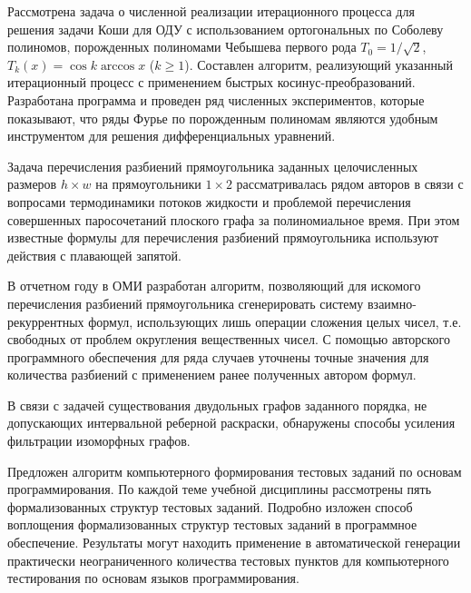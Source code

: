 Рассмотрена задача о численной реализации итерационного процесса для решения задачи Коши для ОДУ с использованием ортогональных по Соболеву полиномов, порожденных полиномами Чебышева первого рода $T_0=1/\sqrt{2}$, $T_k(x)=\cos k\arccos x$ ($k\ge1$). Составлен алгоритм, реализующий указанный итерационный процесс с применением быстрых косинус-преобразова\-ний. Разработана программа и проведен ряд численных экспериментов, которые показывают, что ряды Фурье по порожденным полиномам являются удобным инструментом для решения дифференциальных уравнений.









Задача перечисления разбиений прямоугольника заданных целочисленных размеров $h\times w$ на прямоугольники $1\times 2$ рассматривалась рядом авторов в связи с вопросами термодинамики потоков жидкости и проблемой перечисления совершенных паросочетаний плоского графа за полиномиальное время.
При этом известные формулы для перечисления разбиений прямоугольника используют действия с плавающей запятой. 


В отчетном году в ОМИ разработан алгоритм, позволяющий для искомого перечисления разбиений прямоугольника сгенерировать систему взаимно-рекуррентных формул, использующих лишь операции сложения целых чисел, т.е. свободных от проблем округления вещественных чисел. 
С помощью авторского программного обеспечения для ряда случаев уточнены точные значения для количества разбиений с
применением ранее полученных автором формул.


В связи с задачей существования двудольных графов заданного порядка, не допускающих интервальной реберной раскраски,
обнаружены способы усиления фильтрации изоморфных графов.




Предложен алгоритм компьютерного формирования тестовых заданий по основам программирования. 
По каждой теме учебной дисциплины рассмотрены пять формализованных структур тестовых заданий. 
Подробно изложен способ воплощения формализованных структур тестовых заданий в программное обеспечение.
Результаты могут находить применение в автоматической генерации практически неограниченного количества тестовых пунктов для компьютерного тестирования по основам языков программирования.


